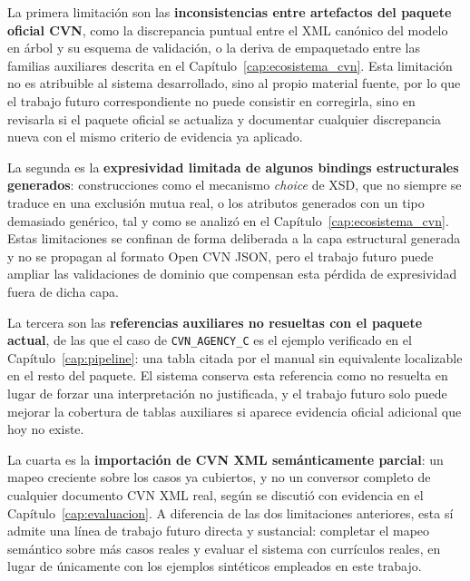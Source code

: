 La primera limitación son las \textbf{inconsistencias entre artefactos del
paquete oficial CVN}, como la discrepancia puntual entre el XML canónico del
modelo en árbol y su esquema de validación, o la deriva de empaquetado entre
las familias auxiliares descrita en el Capítulo~\ref{cap:ecosistema_cvn}.
Esta limitación no es atribuible al sistema desarrollado, sino al propio
material fuente, por lo que el trabajo futuro correspondiente no puede
consistir en corregirla, sino en revisarla si el paquete oficial se
actualiza y documentar cualquier discrepancia nueva con el mismo criterio de
evidencia ya aplicado.

La segunda es la \textbf{expresividad limitada de algunos bindings
estructurales generados}: construcciones como el mecanismo \textit{choice}
de XSD, que no siempre se traduce en una exclusión mutua real, o los
atributos generados con un tipo demasiado genérico, tal y como se analizó en
el Capítulo~\ref{cap:ecosistema_cvn}. Estas limitaciones se confinan de
forma deliberada a la capa estructural generada y no se propagan al formato
Open CVN JSON, pero el trabajo futuro puede ampliar las validaciones de
dominio que compensan esta pérdida de expresividad fuera de dicha capa.

La tercera son las \textbf{referencias auxiliares no resueltas con el
paquete actual}, de las que el caso de \texttt{CVN\_AGENCY\_C} es el
ejemplo verificado en el Capítulo~\ref{cap:pipeline}: una tabla citada por
el manual sin equivalente localizable en el resto del paquete. El sistema
conserva esta referencia como no resuelta en lugar de forzar una
interpretación no justificada, y el trabajo futuro solo puede mejorar la
cobertura de tablas auxiliares si aparece evidencia oficial adicional que
hoy no existe.

La cuarta es la \textbf{importación de CVN XML semánticamente parcial}: un
mapeo creciente sobre los casos ya cubiertos, y no un conversor completo de
cualquier documento CVN XML real, según se discutió con evidencia en el
Capítulo~\ref{cap:evaluacion}. A diferencia de las dos limitaciones
anteriores, esta sí admite una línea de trabajo futuro directa y
sustancial: completar el mapeo semántico sobre más casos reales y evaluar
el sistema con currículos reales, en lugar de únicamente con los ejemplos
sintéticos empleados en este trabajo.


